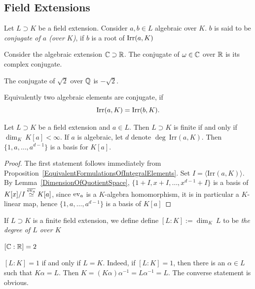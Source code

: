 \subsection{Field Extensions}
    \begin{definition}
        Let $L\supset K$ be a field extension. Consider $a,b\in L$ algebraic over $K$. $b$ is said to be \emph{conjugate of $a$ (over $K$)}, if $b$ is a root of $\mathrm{Irr}(a,K)$
    \end{definition}
    \begin{example}
        Consider the algebraic extension $\mathbb{C}\supset \mathbb{R}$. The conjugate of $\omega\in \mathbb{C}$ over $\mathbb{R}$ is its complex conjugate. 
    \end{example}
    \begin{example}
        The conjugate of $\sqrt{2}$ over $\mathbb{Q}$ is $-\sqrt{2}$. 
    \end{example} 
    \begin{remark}
        Equivalently two algebraic elements are conjugate, if 
        $$
            \mathrm{Irr}(a,K) = \mathrm{Irr}(b,K).
        $$
    \end{remark}
    \begin{lemma}
        Let $L\supset K$ be a field extension and $a\in L$. Then $L\supset K$ is finite if and only if $\dim_K \ K[a] <\infty$. If $a$ is algebraic, let $d$ denote $\deg \ \mathrm{Irr}(a,K)$. Then $\{1,a,\dots,a^{d-1}\}$ is a basis for $K[a]$. 
    \end{lemma}
    \begin{proof}
        The first statement follows immediately from Proposition~\ref{EquivalentFormulationsOfIntegralElements}. Set $I=\langle \mathrm{Irr}(a,K)\rangle$. By Lemma~\ref{DimensionOfQuotientSpace}, $\{1+ I,x+I,\dots,x^{d-1}+I\}$ is a basis of $K[x]/I \overset{\overline{\mathrm{ev}_a}}{\simeq} K[a]$, since $\mathrm{ev}_a$ is a $K$-algebra homomorphism, it is in particular a $K$-linear map, hence $\{1,a,\dots,a^{d-1}\}$ is a basis of $K[a]$
    \end{proof}
    \begin{definition}
        If $L\supset K$ is a finite field extension, we define define $[L:K]:= \dim_K\ L$ to be \textit{the degree of $L$ over $K$} 
    \end{definition}
   \begin{example}
        $[\mathbb{C} : \mathbb{R}] = 2$
   \end{example}
   \begin{example}
        $[L : K] = 1$ if and only if $ L = K$. Indeed, if $[L:K]=1$, then there is an $\alpha\in L$ such that $K\alpha = L$. Then $K = (K\alpha)\alpha^{-1} = L\alpha^{-1}=L$. The converse statement is obvious. 
   \end{example}
